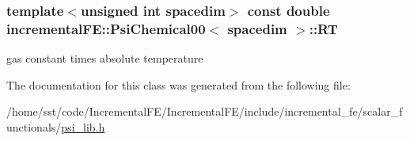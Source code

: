 \subsubsection[{\texorpdfstring{RT}{RT}}]{\setlength{\rightskip}{0pt plus 5cm}template$<$unsigned int spacedim$>$ const double {\bf incremental\+F\+E\+::\+Psi\+Chemical00}$<$ spacedim $>$\+::RT\hspace{0.3cm}{\ttfamily [private]}}\hypertarget{classincremental_f_e_1_1_psi_chemical00_ad2500e079225b055e821ecc9e4baf3b6}{}\label{classincremental_f_e_1_1_psi_chemical00_ad2500e079225b055e821ecc9e4baf3b6}
gas constant times absolute temperature 

The documentation for this class was generated from the following file\+:\begin{DoxyCompactItemize}
\item 
/home/sst/code/\+Incremental\+F\+E/\+Incremental\+F\+E/include/incremental\+\_\+fe/scalar\+\_\+functionals/\hyperlink{psi__lib_8h}{psi\+\_\+lib.\+h}\end{DoxyCompactItemize}
